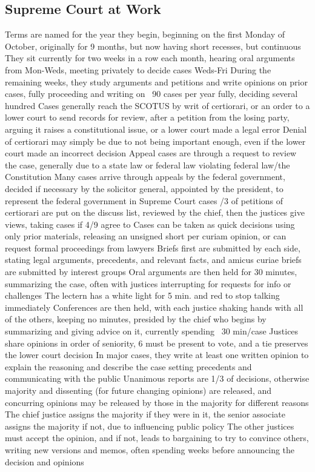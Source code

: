 \documentclass[11 pt, twoside]{article}
\newenvironment{outline*}
{
	\begin{outline}[enumerate]
	}
	{\end{outline}
}
\begin{document}
\subsection{Supreme Court at Work}
\begin{outline*}
\1 Terms are named for the year they begin, beginning on the first Monday of October, originally for 9 months, but now having short recesses, but continuous
\2 They sit currently for two weeks in a row each month, hearing oral arguments from Mon-Weds, meeting privately to decide cases Weds-Fri
\2 During the remaining weeks, they study arguments and petitions and write opinions on prior cases, fully proceeding and writing on ~90 cases per year fully, deciding several hundred
\1 Cases generally reach the SCOTUS by writ of certiorari, or an order to a lower court to send records for review, after a petition from the losing party, arguing it raises a constitutional issue, or a lower court made a legal error
\2 Denial of certiorari may simply be due to not being important enough, even if the lower court made an incorrect decision
\2 Appeal cases are through a request to review the case, generally due to a state law or federal law violating federal law/the Constitution
\2 Many cases arrive through appeals by the federal government, decided if necessary by the solicitor general, appointed by the president, to represent the federal government in Supreme Court cases
/3 of petitions of certiorari are put on the discuss list, reviewed by the chief, then the justices give views, taking cases if 4/9 agree to
\2 Cases can be taken as quick decisions using only prior materials, releasing an unsigned short per curiam opinion, or can request formal proceedings from lawyers
\1 Briefs first are submitted by each side, stating legal arguments, precedents, and relevant facts, and amicus curiae briefs are submitted by interest groups
\2 Oral arguments are then held for 30 minutes, summarizing the case, often with justices interrupting for requests for info or challenges
\2 The lectern has a white light for 5 min. and red to stop talking immediately
\2 Conferences are then held, with each justice shaking hands with all of the others, keeping no minutes, presided by the chief who begins by summarizing and giving advice on it, currently spending ~30 min/case
\2 Justices share opinions in order of seniority, 6 must be present to vote, and a tie preserves the lower court decision
\1 In major cases, they write at least one written opinion to explain the reasoning and describe the case setting precedents and communicating with the public
\2 Unanimous reports are 1/3 of decisions, otherwise majority and dissenting (for future changing opinions) are released, and concurring opinions may be released by those in the majority for different reasons
\2 The chief justice assigns the majority if they were in it, the senior associate assigns the majority if not, due to influencing public policy
\2 The other justices must accept the opinion, and if not, leads to bargaining to try to convince others, writing new versions and memos, often spending weeks before announcing the decision and opinions
\end{outline*}
\end{document}

